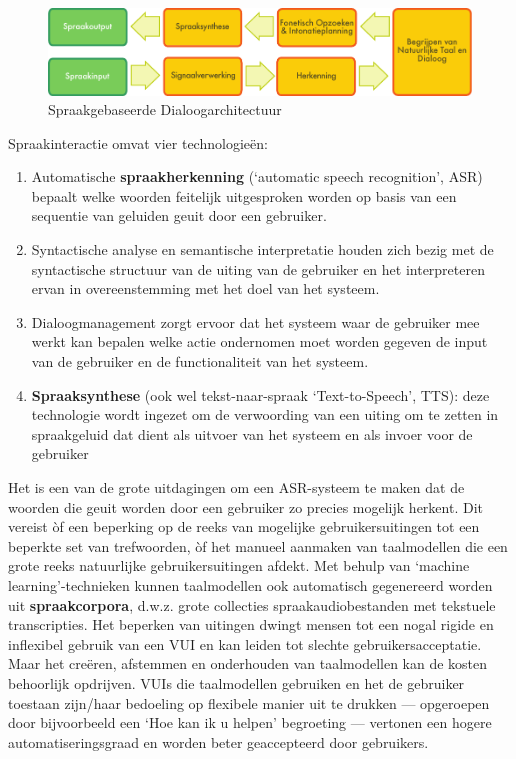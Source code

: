 \begin{multicols}{2}

\begin{figure}[htb]
  \center  \includegraphics[width=\textwidth]{../_media/dutch/simple_speech-based_dialogue_architecture}
  \center
  \caption{Spraakgebaseerde Dialoogarchitectuur}
  \label{fig:dialoguearch_de}
\end{figure}

    Spraakinteractie omvat vier technologie{\"e}n:
    \begin{enumerate}
    \item Automatische \textbf{spraakherkenning} (`automatic speech recognition', ASR) bepaalt welke woorden feitelijk uitgesproken worden op basis van een sequentie van geluiden geuit door een gebruiker.
 	\item Syntactische analyse en semantische interpretatie houden zich bezig met de syntactische structuur van de uiting van de gebruiker en het interpreteren ervan in overeenstemming met het doel van het systeem.
 	\item Dialoogmanagement zorgt ervoor dat het systeem waar de gebruiker mee werkt kan bepalen welke actie ondernomen moet worden gegeven de input van de gebruiker en de functionaliteit van het systeem.
 	\item \textbf{Spraaksynthese} (ook wel tekst-naar-spraak `Text-to-Speech', TTS): deze technologie wordt ingezet om de verwoording van een uiting om te zetten in spraakgeluid dat dient als uitvoer van het systeem en als invoer voor de gebruiker
    \end{enumerate}

    Het is een van de grote uitdagingen om een ASR-systeem te maken dat de woorden die geuit worden door een gebruiker zo precies mogelijk herkent.  Dit vereist {\`o}f een beperking op de reeks van mogelijke gebruikersuitingen tot een beperkte set van trefwoorden, {\`o}f het manueel aanmaken van taalmodellen die een grote reeks natuurlijke gebruikersuitingen afdekt. Met behulp van `machine learning'-technieken kunnen taalmodellen ook automatisch gegenereerd worden uit \textbf{spraakcorpora}, d.w.z. grote collecties spraakaudiobestanden met tekstuele transcripties. Het beperken van uitingen dwingt mensen tot een nogal rigide en inflexibel gebruik van een VUI en kan leiden tot slechte gebruikersacceptatie. Maar het cre{\"e}ren, afstemmen en onderhouden van taalmodellen kan de kosten behoorlijk opdrijven. VUIs die taalmodellen gebruiken en het de gebruiker toestaan zijn/haar bedoeling op flexibele manier uit te drukken --- opgeroepen door bijvoorbeeld een `Hoe kan ik u helpen' begroeting --- vertonen een hogere automatiseringsgraad en worden beter geaccepteerd door gebruikers.


\end{multicols}
